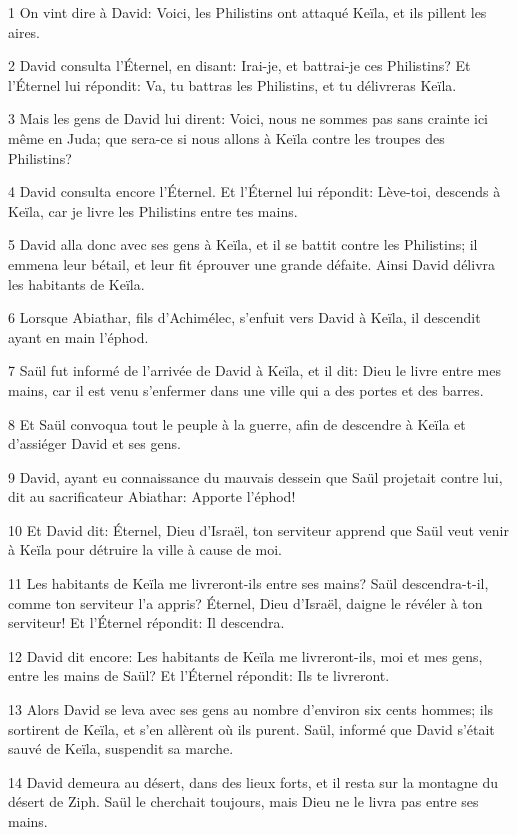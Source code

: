 \par 1 On vint dire à David: Voici, les Philistins ont attaqué Keïla, et ils pillent les aires.
\par 2 David consulta l'Éternel, en disant: Irai-je, et battrai-je ces Philistins? Et l'Éternel lui répondit: Va, tu battras les Philistins, et tu délivreras Keïla.
\par 3 Mais les gens de David lui dirent: Voici, nous ne sommes pas sans crainte ici même en Juda; que sera-ce si nous allons à Keïla contre les troupes des Philistins?
\par 4 David consulta encore l'Éternel. Et l'Éternel lui répondit: Lève-toi, descends à Keïla, car je livre les Philistins entre tes mains.
\par 5 David alla donc avec ses gens à Keïla, et il se battit contre les Philistins; il emmena leur bétail, et leur fit éprouver une grande défaite. Ainsi David délivra les habitants de Keïla.
\par 6 Lorsque Abiathar, fils d'Achimélec, s'enfuit vers David à Keïla, il descendit ayant en main l'éphod.
\par 7 Saül fut informé de l'arrivée de David à Keïla, et il dit: Dieu le livre entre mes mains, car il est venu s'enfermer dans une ville qui a des portes et des barres.
\par 8 Et Saül convoqua tout le peuple à la guerre, afin de descendre à Keïla et d'assiéger David et ses gens.
\par 9 David, ayant eu connaissance du mauvais dessein que Saül projetait contre lui, dit au sacrificateur Abiathar: Apporte l'éphod!
\par 10 Et David dit: Éternel, Dieu d'Israël, ton serviteur apprend que Saül veut venir à Keïla pour détruire la ville à cause de moi.
\par 11 Les habitants de Keïla me livreront-ils entre ses mains? Saül descendra-t-il, comme ton serviteur l'a appris? Éternel, Dieu d'Israël, daigne le révéler à ton serviteur! Et l'Éternel répondit: Il descendra.
\par 12 David dit encore: Les habitants de Keïla me livreront-ils, moi et mes gens, entre les mains de Saül? Et l'Éternel répondit: Ils te livreront.
\par 13 Alors David se leva avec ses gens au nombre d'environ six cents hommes; ils sortirent de Keïla, et s'en allèrent où ils purent. Saül, informé que David s'était sauvé de Keïla, suspendit sa marche.
\par 14 David demeura au désert, dans des lieux forts, et il resta sur la montagne du désert de Ziph. Saül le cherchait toujours, mais Dieu ne le livra pas entre ses mains.
